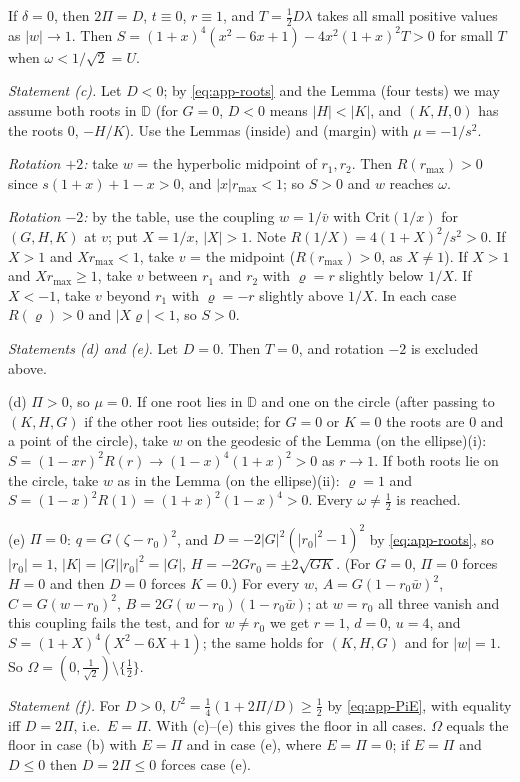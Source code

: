 \documentclass[11pt,reqno]{amsart}
\theoremstyle{plain}
\theoremstyle{definition}
\theoremstyle{remark}
\newcommand{\Crit}{\mathrm{Crit}}
\begin{document}
If $\delta=0$, then $2\Pi=D$, $t\equiv0$, $r\equiv1$, and $T=\frac12D\lambda$ takes all small positive values
as $|w|\to1$. Then $S=(1+x)^{4}(x^{2}-6x+1)-4x^{2}(1+x)^{2}T>0$ for small $T$ when $\omega<1/\sqrt2=U$.

\medskip\noindent\emph{Statement (c).}
Let $D<0$; by \eqref{eq:app-roots} and the Lemma (four tests) we may assume both roots in $\mathbb D$ (for $G=0$,
$D<0$ means $|H|<|K|$, and $(K,H,0)$ has the roots $0$, $-H/K$). Use the Lemmas (inside) and (margin)
with $\mu=-1/s^{2}$.

\emph{Rotation $+2$:} take $w$ = the hyperbolic midpoint of $r_1,r_2$. Then $R(r_{\max})>0$ since
$s(1+x)+1-x>0$, and $|x|r_{\max}<1$; so $S>0$ and $w$ reaches $\omega$.

\emph{Rotation $-2$:} by the table, use the coupling $w=1/\bar v$ with $\Crit(1/x)$ for $(G,H,K)$ at
$v$; put $X=1/x$, $|X|>1$. Note $R(1/X)=4(1+X)^{2}/s^{2}>0$. If $X>1$ and $Xr_{\max}<1$, take $v$ = the
midpoint ($R(r_{\max})>0$, as $X\ne1$). If $X>1$ and $Xr_{\max}\ge1$, take $v$ between $r_1$ and $r_2$ with
$\varrho=r$ slightly below $1/X$. If $X<-1$, take $v$ beyond $r_1$ with $\varrho=-r$ slightly above $1/X$. In
each case $R(\varrho)>0$ and $|X\varrho|<1$, so $S>0$.

\medskip\noindent\emph{Statements (d) and (e).}
Let $D=0$. Then $T=0$, and rotation $-2$ is excluded above.

(d) $\Pi>0$, so $\mu=0$. If one root lies in $\mathbb D$ and one on the circle (after passing to $(K,H,G)$ if the other
root lies outside; for $G=0$ or $K=0$ the roots are $0$ and a point of the circle), take $w$ on the
geodesic of the Lemma (on the ellipse)(i): $S=(1-xr)^{2}R(r)\to(1-x)^{4}(1+x)^{2}>0$ as $r\to1$. If both roots lie
on the circle, take $w$ as in the Lemma (on the ellipse)(ii): $\varrho=1$ and $S=(1-x)^{2}R(1)=(1+x)^{2}(1-x)^{4}>0$.
Every $\omega\ne\frac12$ is reached.

(e) $\Pi=0$: $q=G(\zeta-r_0)^{2}$, and $D=-2|G|^{2}(|r_0|^{2}-1)^{2}$ by \eqref{eq:app-roots}, so $|r_0|=1$,
$|K|=|G||r_0|^{2}=|G|$, $H=-2Gr_0=\pm2\sqrt{GK}$. (For $G=0$, $\Pi=0$ forces $H=0$ and then $D=0$ forces
$K=0$.) For every $w$, $A=G(1-r_0\bar w)^{2}$, $C=G(w-r_0)^{2}$, $B=2G(w-r_0)(1-r_0\bar w)$; at $w=r_0$ all three vanish and this coupling fails the test, and for $w\ne r_0$ we get $r=1$,
$d=0$, $u=4$, and $S=(1+X)^{4}(X^{2}-6X+1)$; the same holds for $(K,H,G)$ and for $|w|=1$. So
$\Omega=(0,\frac1{\sqrt2})\setminus\{\frac12\}$.

\medskip\noindent\emph{Statement (f).}
For $D>0$, $U^{2}=\frac14(1+2\Pi/D)\ge\frac12$ by \eqref{eq:app-PiE}, with equality iff $D=2\Pi$, i.e.\ $E=\Pi$.
With (c)--(e) this gives the floor in all cases. $\Omega$ equals the floor in case (b) with $E=\Pi$ and in
case (e), where $E=\Pi=0$; if $E=\Pi$ and $D\le0$ then $D=2\Pi\le0$ forces case (e).
\end{document}

